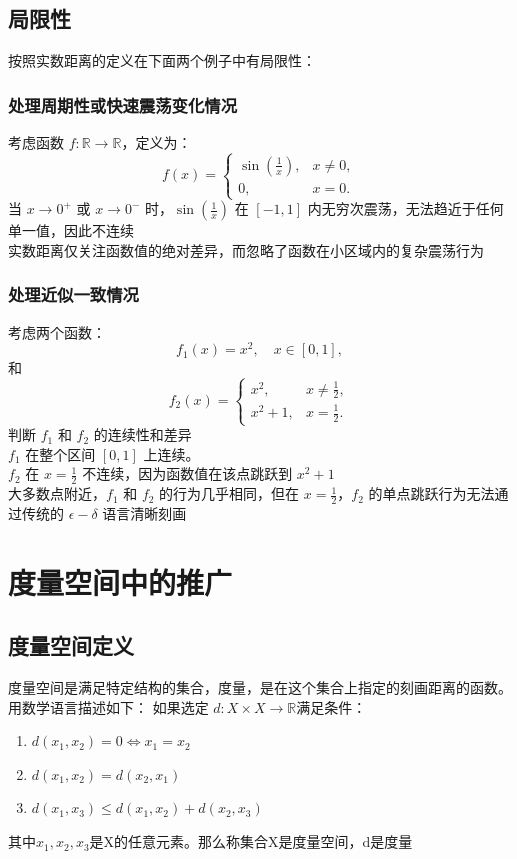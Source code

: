 \documentclass[a4paper, oneside]{article}
\begin{document}
\subsection{局限性}
按照实数距离的定义在下面两个例子中有局限性：
\subsubsection{处理周期性或快速震荡变化情况}
考虑函数 $f: \mathbb{R} \to \mathbb{R}$，定义为：
\[
f(x) =
\begin{cases}
\sin\left(\frac{1}{x}\right), & x \neq 0, \\
0, & x = 0.
\end{cases}
\]
当 $x \to 0^+$ 或 $x \to 0^-$ 时，$\sin\left(\frac{1}{x}\right)$ 在 $[-1, 1]$ 内无穷次震荡，无法趋近于任何单一值，因此不连续\\
实数距离仅关注函数值的绝对差异，而忽略了函数在小区域内的复杂震荡行为
\subsubsection{处理近似一致情况}
考虑两个函数：
\[
f_1(x) = x^2, \quad x \in [0, 1],
\]
和
\[
f_2(x) =
\begin{cases}
x^2, & x \neq \frac{1}{2}, \\
x^2 + 1, & x = \frac{1}{2}.
\end{cases}
\]
判断 $f_1$ 和 $f_2$ 的连续性和差异 \\
$f_1$ 在整个区间 $[0, 1]$ 上连续。\\
$f_2$ 在 $x = \frac{1}{2}$ 不连续，因为函数值在该点跳跃到 $x^2 + 1$ \\
大多数点附近，$f_1$ 和 $f_2$ 的行为几乎相同，但在 $x = \frac{1}{2}$，$f_2$ 的单点跳跃行为无法通过传统的 $\epsilon-\delta$ 语言清晰刻画

\section{度量空间中的推广}
\subsection{度量空间定义}
度量空间是满足特定结构的集合，度量，是在这个集合上指定的刻画距离的函数。用数学语言描述如下：
如果选定 $d:X\times X\rightarrow  \mathbb{R} $满足条件：
\begin{enumerate}
    \item $d(x_1,x_2) = 0 \Leftrightarrow x_1 = x_2 $
    \item $d(x_1,x_2) = d(x_2,x_1) $
    \item $d(x_1,x_3)\le d(x_1,x_2) + d(x_2,x_3) $
\end{enumerate}
其中$x_1,x_2,x_3$是X的任意元素。那么称集合X是度量空间，d是度量
\end{document}
